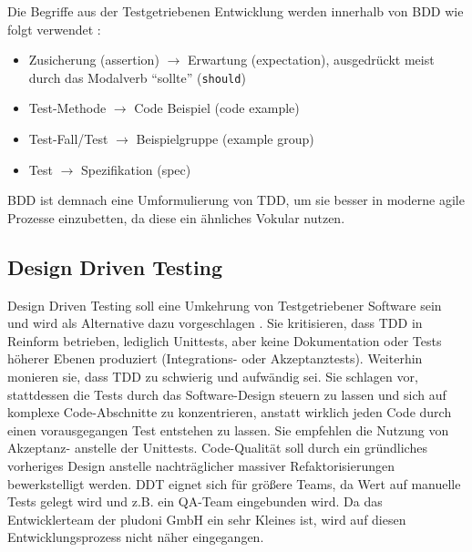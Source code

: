 Die Begriffe aus der Testgetriebenen Entwicklung werden innerhalb von BDD wie folgt verwendet \citep[S. 151]{chelimsky_rspec_2010}:
\begin{itemize}
 \item Zusicherung (assertion) $\to$ Erwartung (expectation), ausgedrückt meist durch das Modalverb "`sollte"' (\texttt{should})
 \item Test-Methode $\to$ Code Beispiel (code example)
 \item Test-Fall/Test $\to$ Beispielgruppe (example group)
 \item Test $\to$ Spezifikation (spec)
\end{itemize}
BDD ist demnach eine Umformulierung von TDD, um sie besser in moderne agile Prozesse einzubetten, da diese ein ähnliches Vokular nutzen.

\subsection{Design Driven Testing}
Design Driven Testing soll eine Umkehrung von Testgetriebener Software sein und wird als Alternative dazu vorgeschlagen \citep{stephens_design_2010}. Sie kritisieren, dass TDD in Reinform betrieben, lediglich Unittests, aber keine Dokumentation oder Tests höherer Ebenen produziert (Integrations- oder Akzeptanztests). Weiterhin monieren sie, dass TDD zu schwierig und aufwändig sei. Sie schlagen vor, stattdessen die Tests durch das Software-Design steuern zu lassen und sich auf komplexe Code-Abschnitte zu konzentrieren, anstatt wirklich jeden Code durch einen vorausgegangen Test entstehen zu lassen. Sie empfehlen die Nutzung von Akzeptanz- anstelle der Unittests. Code-Qualität soll durch ein gründliches vorheriges Design anstelle nachträglicher massiver Refaktorisierungen bewerkstelligt werden.
DDT eignet sich für größere Teams, da Wert auf manuelle Tests gelegt wird und z.B. ein QA-Team eingebunden wird. Da das Entwicklerteam der pludoni GmbH ein sehr Kleines ist, wird auf diesen Entwicklungsprozess nicht näher eingegangen.
